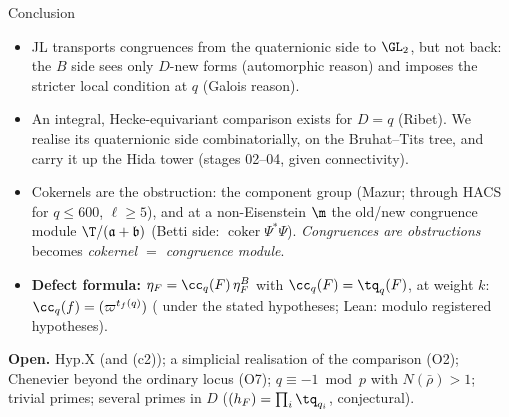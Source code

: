 \begin{frame}{Conclusion}
  \small
  \begin{itemize}\setlength{\itemsep}{1pt}
    \item JL transports congruences from the quaternionic side to $\GL_2$, but not back: the $B$ side sees only $D$-new forms
      (automorphic reason) and imposes the stricter local condition at $q$ (Galois reason).
    \item An integral, Hecke-equivariant comparison exists for $D=q$ (Ribet). We realise its quaternionic side combinatorially, on
      the Bruhat--Tits tree, and carry it up the Hida tower (stages 02--04, \stproved{} given connectivity).
    \item Cokernels are the obstruction: the component group (Mazur; through HACS for $q\le600$, $\ell\ge5$), and at a non-Eisenstein $\m$
      the old/new congruence module $\T/(\mathfrak a+\mathfrak b)$ (Betti side: $\operatorname{coker}\Psi^*\Psi$).
      \emph{Congruences are obstructions} becomes \emph{cokernel $=$ congruence module}.
    \item \textbf{Defect formula:} $\eta_F=\cc_q(F)\,\eta^B_F$ with $\cc_q(F)=\tq_q(F)$, at weight $k$: $\cc_q(f)=(\varpi^{t_f(q)})$
      (\stpmc{} under the stated hypotheses; Lean: modulo registered hypotheses).
  \end{itemize}
  \textbf{Open.} $\mathrm{Hyp.X}$ (and (c2)); a simplicial realisation of the comparison (O2); Chenevier beyond the ordinary locus (O7);
  $q\equiv-1\bmod p$ with $N(\bar\rho)>1$; trivial primes; several primes in $D$ ($(h_F)=\prod_i\tq_{q_i}$, conjectural).
  \vfill
\end{frame}
